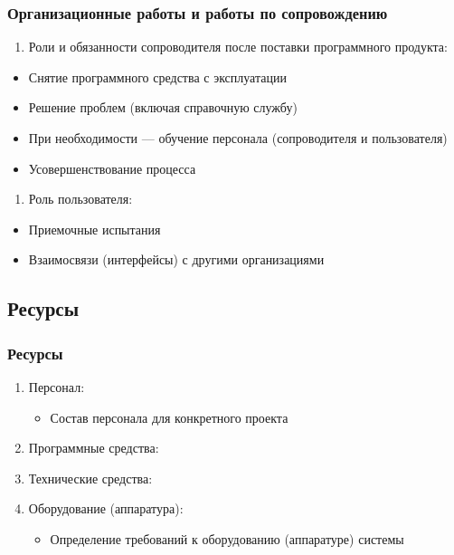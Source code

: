 \documentclass{industrial-development}
\begin{document}
\lecturenotes

\begin{frame} \frametitle{Организационные работы и работы по сопровождению}
	\begin{enumerate}[2] \item Роли и обязанности сопроводителя после поставки программного продукта:  \end{enumerate}
	\begin{itemize}
		\item Снятие программного средства с эксплуатации 
		\item Решение проблем (включая справочную службу) 
		\item При необходимости — обучение персонала (сопроводителя и пользователя) 
		\item Усовершенствование процесса
	\end{itemize}
		\begin{enumerate}[3]\item Роль пользователя: \end{enumerate}
	\begin{itemize}
		\item Приемочные испытания  
		\item Взаимосвязи (интерфейсы) с другими организациями
	\end{itemize}
\end{frame}

\lecturenotes


\subsection{Ресурсы}
\begin{frame} \frametitle{Ресурсы}
	\begin{enumerate} \item Персонал:  
	\begin{itemize}
		\item Состав персонала для конкретного проекта 
	\end{itemize}
		\item Программные средства: 
		\item Технические средства: 
		\item Оборудование (аппаратура): 
	\begin{itemize}
		\item Определение требований к оборудованию (аппаратуре) системы 
	\end{itemize}
	\end{enumerate}
\end{frame}
\end{document}
